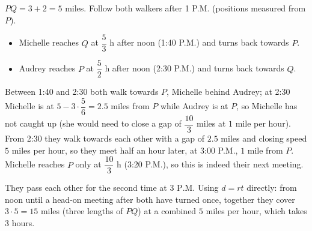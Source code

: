 $PQ=3+2=5$ miles. Follow both walkers after 1 P.M. (positions measured from $P$).
\begin{itemize}
\item Michelle reaches $Q$ at $\dfrac{5}{3}$ h after noon (1:40 P.M.) and turns back towards $P$.
\item Audrey reaches $P$ at $\dfrac{5}{2}$ h after noon (2:30 P.M.) and turns back towards $Q$.
\end{itemize}
Between 1:40 and 2:30 both walk towards $P$, Michelle behind Audrey; at 2:30 Michelle is at $5-3\cdot\dfrac{5}{6}=2.5$ miles from $P$ while Audrey is at $P$, so Michelle has not caught up (she would need to close a gap of $\dfrac{10}{3}$ miles at $1$ mile per hour). From 2:30 they walk towards each other with a gap of $2.5$ miles and closing speed $5$ miles per hour, so they meet half an hour later, at 3:00 P.M., $1$ mile from $P$. Michelle reaches $P$ only at $\dfrac{10}{3}$ h (3:20 P.M.), so this is indeed their next meeting.

They pass each other for the second time at $\boxed{3\text{ P.M.}}$ Using $d=rt$ directly: from noon until a head-on meeting after both have turned once, together they cover $3\cdot5=15$ miles (three lengths of $PQ$) at a combined $5$ miles per hour, which takes $3$ hours.
